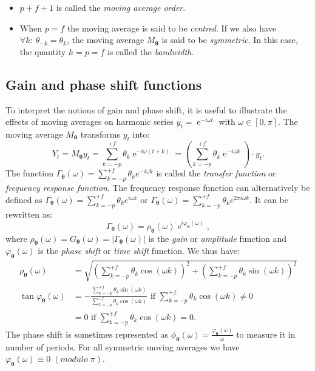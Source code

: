 \documentclass[
]{article}
\DeclareMathOperator{\e}{e}
\newcommand\1{\mathds{1}}
\begin{document}
\begin{itemize}
\item
  \(p+f+1\) is called the \emph{moving average order}.
\item
  When \(p=f\) the moving average is said to be \emph{centred}. If we
  also have \(\forall k:\:\theta_{-k} = \theta_k\), the moving average
  \(M_{\boldsymbol\theta}\) is said to be \emph{symmetric}. In this
  case, the quantity \(h=p=f\) is called the \emph{bandwidth}.
\end{itemize}

\subsection{Gain and phase shift functions}\label{subsec:gain-deph}

To interpret the notions of gain and phase shift, it is useful to
illustrate the effects of moving averages on harmonic series
\(y_t=\e^{-i\omega t}\) with \(\omega\in[0,\pi]\). The moving average
\(M_{\boldsymbol\theta}\) transforms \(y_t\) into: \[
Y_t = M_{\boldsymbol\theta}y_t = \sum_{k=-p}^{+f} \theta_k \e^{-i \omega (t+k)}
= \left(\sum_{k=-p}^{+f} \theta_k \e^{-i \omega k}\right)\cdot y_t.
\] The function
\(\Gamma_{\boldsymbol\theta}(\omega)=\sum_{k=-p}^{+f} \theta_k e^{-i \omega k}\)
is called the \emph{transfer function} or \emph{frequency response
function}. The frequency response function can alternatively be defined
as
\(\Gamma_{\boldsymbol\theta}(\omega)=\sum_{k=-p}^{+f} \theta_k e^{i \omega k}\)
or
\(\Gamma_{\boldsymbol\theta}(\omega)=\sum_{k=-p}^{+f} \theta_k e^{2\pi i \omega k}\).
It can be rewritten as: \[
\Gamma_{\boldsymbol\theta}(\omega) = \rho_{\boldsymbol\theta}(\omega)\e^{i\varphi_{\boldsymbol\theta}(\omega)},
\] where
\(\rho_{\boldsymbol\theta}(\omega)=G_{\boldsymbol\theta}(\omega)=\lvert\Gamma_{\boldsymbol\theta}(\omega)\rvert\)
is the \emph{gain} or \emph{amplitude} function and
\(\varphi_{\boldsymbol\theta}(\omega)\) is the \emph{phase shift} or
\emph{time shift} function. We thus have: \begin{align*}
\rho_{\boldsymbol\theta}(\omega) &=\sqrt{\left(\sum_{k=-p}^{+f}\theta_k\cos(\omega k)\right)^2+
\left(\sum_{k=-p}^{+f}\theta_k\sin(\omega k)\right)^2} \\
\tan \varphi_{\boldsymbol\theta}(\omega) &=- \frac{\sum_{k=-p}^{+f}\theta_k\sin(\omega k)}{\sum_{k=-p}^{+f}\theta_k\cos(\omega k)} \text{ if }\sum_{k=-p}^{+f}\theta_k\cos(\omega k) \ne 0 \\
&= 0 \text{ if }\sum_{k=-p}^{+f}\theta_k\cos(\omega k) = 0.
\end{align*} The phase shift is sometimes represented as
\(\phi_{\boldsymbol\theta}(\omega)=\frac{\varphi_{\boldsymbol\theta}(\omega)}{\omega}\)
to measure it in number of periods. For all symmetric moving averages we
have \(\varphi_{\boldsymbol\theta}(\omega)\equiv 0 \;(modulo\;{\pi})\).
\end{document}
